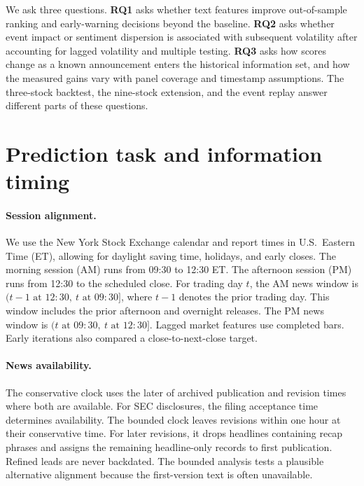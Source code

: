 \documentclass{article}
\begin{document}
We ask three questions. \textbf{RQ1} asks whether text features improve out-of-sample ranking and early-warning decisions beyond the baseline. \textbf{RQ2} asks whether event impact or sentiment dispersion is associated with subsequent volatility after accounting for lagged volatility and multiple testing. \textbf{RQ3} asks how scores change as a known announcement enters the historical information set, and how the measured gains vary with panel coverage and timestamp assumptions. The three-stock backtest, the nine-stock extension, and the event replay answer different parts of these questions.

\section{Prediction task and information timing}
\label{sec:problem}

\paragraph{Session alignment.}
We use the New York Stock Exchange calendar and report times in U.S.\ Eastern Time (ET), allowing for daylight saving time, holidays, and early closes. The morning session (AM) runs from 09:30 to 12:30 ET. The afternoon session (PM) runs from 12:30 to the scheduled close. For trading day $t$, the AM news window is $(t-1\text{ at }12{:}30,\ t\text{ at }09{:}30]$, where $t-1$ denotes the prior trading day. This window includes the prior afternoon and overnight releases. The PM news window is $(t\text{ at }09{:}30,\ t\text{ at }12{:}30]$. Lagged market features use completed bars. Early iterations also compared a close-to-next-close target.

\paragraph{News availability.}
The conservative clock uses the later of archived publication and revision times where both are available. For SEC disclosures, the filing acceptance time determines availability. The bounded clock leaves revisions within one hour at their conservative time. For later revisions, it drops headlines containing recap phrases and assigns the remaining headline-only records to first publication. Refined leads are never backdated. The bounded analysis tests a plausible alternative alignment because the first-version text is often unavailable.
\end{document}
